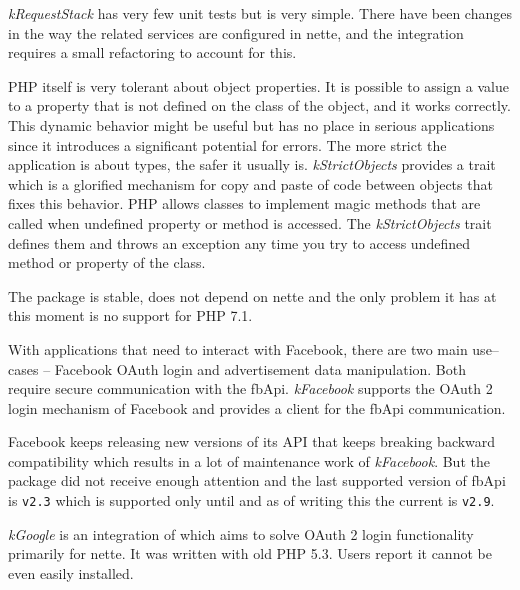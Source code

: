 \textit{\gls{kRequestStack}} has very few unit tests but is very simple. There have been changes in the way the related services are configured in \gls{nette}, and the integration requires a small refactoring to account for this.

 \label{sec:state:strict-objects}

PHP itself is very tolerant about object properties. It is possible to assign a value to a property that is not defined on the class of the object, and it works correctly. This dynamic behavior might be useful but has no place in serious applications since it introduces a significant potential for errors. The more strict the application is about types, the safer it usually is. \textit{\gls{kStrictObjects}} provides a trait which is a glorified mechanism for copy and paste of code between objects that fixes this behavior. PHP allows classes to implement magic methods that are called when undefined property or method is accessed. The \textit{\gls{kStrictObjects}} trait defines them and throws an exception any time you try to access undefined method or property of the class.

The package is stable, does not depend on \gls{nette} and the only problem it has at this moment is no support for PHP 7.1.

 \label{sec:state:facebook}

With applications that need to interact with Facebook, there are two main use--cases -- Facebook OAuth login and advertisement data manipulation. Both require secure communication with the \gls{fbApi}. \textit{\gls{kFacebook}} supports the OAuth 2 login mechanism of Facebook and provides a client for the \gls{fbApi} communication.

Facebook keeps releasing new versions of its API that keeps breaking backward compatibility which results in a lot of maintenance work of \textit{\gls{kFacebook}}. But the package did not receive enough attention and the last supported version of \gls{fbApi} is \lstinline{v2.3} which is supported only until  and as of writing this the current  is \lstinline{v2.9}.

 \label{sec:state:google}

\textit{\gls{kGoogle}} is an integration of  which aims to solve OAuth 2 login functionality primarily for \gls{nette}. It was written with old PHP 5.3. Users report it cannot be even easily installed.


